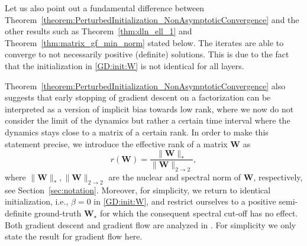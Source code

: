 \documentclass{svproc}
\newcommand{\bW}{\boldsymbol{W}}
\newcommand{\0}{\boldsymbol{0}}
\newcommand{\1}{\boldsymbol{1}}
\begin{document}

Let us also point out a fundamental difference between Theorem~\ref{theorem:PerturbedInitialization_NonAsymptoticConvergence} and the other results such as Theorem~\ref{thm:dln_ell_1} and Theorem~\ref{thm:matrix_gf_min_norm} stated below. The iterates are able to converge to not necessarily positive (definite) solutions. This is due to the fact that the initialization 
in \eqref{GD:init:W} is not identical for all layers.


Theorem~\ref{theorem:PerturbedInitialization_NonAsymptoticConvergence}
also suggests that early stopping of gradient descent on a factorization can be interpreted as a version of implicit bias towards low rank, where we now do not consider the limit of the dynamics but rather a certain time interval where the dynamics stays close to a matrix of a certain rank.
In order to make this statement precise,
we introduce the effective rank of a matrix $\bW$ as
\begin{equation}
    r(\bW) = \frac{\|\bW\|_*}{\|\bW\|_{2 \to 2}},
\end{equation}
where $\|\bW\|_*, \|\bW\|_{2 \to 2}$ are the nuclear and spectral norm of $\bW$, respectively, see Section~\ref{sec:notation}.
Moreover, for simplicity, we return to identical initialization, i.e., $\beta=0$ in \eqref{GD:init:W}, and restrict ourselves to a positive semi-definite ground-truth $\bW_\star$ for which the consequent spectral cut-off has no effect. Both gradient descent and gradient flow are analyzed in \cite[Theorems~3.1 and 3.5]{chou2024gradient}. For simplicity we only state the result for gradient flow here.

\end{document}
